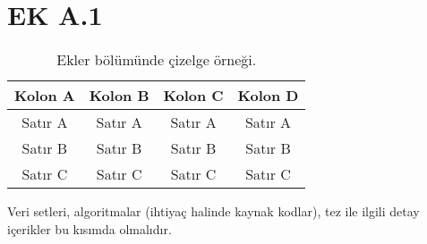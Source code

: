 \chapter{EK A.1}


\begin{table*}[!ht]
{\setlength{\tabcolsep}{14pt}
\caption{Ekler b\"ol\"um\"unde \c{c}izelge \"orne\u{g}i.}
\begin{center}
\vspace{-6mm}
\begin{tabular}{cccc}
\hline\hline
Kolon A & Kolon B & Kolon C & Kolon D \\
\hline
Sat\i r A & Sat\i r A & Sat\i r A & Sat\i r A \\
Sat\i r B & Sat\i r B & Sat\i r B & Sat\i r B \\
Sat\i r C & Sat\i r C & Sat\i r C & Sat\i r C \\
\hline
\end{tabular}
\vspace{-6mm}
\end{center}
\label{tableappendix2}}
\end{table*}

Veri setleri, algoritmalar (ihtiyaç halinde kaynak kodlar), tez ile ilgili detay içerikler bu kısımda olmalıdır.


